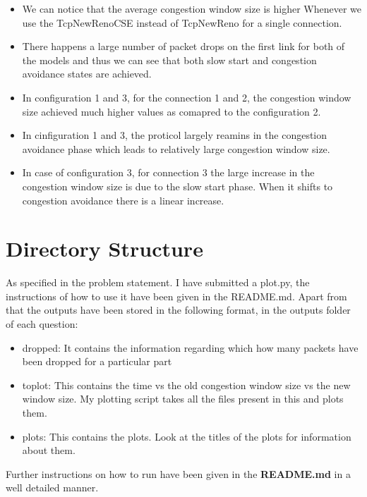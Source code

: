\documentclass{article}
\begin{document}
\begin{itemize}
    \item We can notice that the average congestion window size is higher Whenever we use the TcpNewRenoCSE instead of TcpNewReno for a single connection. 
    \item There happens a large number of packet drops on the first link for both of the models and thus we can see that both slow start and congestion avoidance states are achieved.
    \item In configuration 1 and 3, for the connection 1 and 2, the congestion window size achieved much higher values as comapred to the configuration 2.
    \item In cinfiguration 1 and 3, the proticol largely reamins in the congestion avoidance phase which leads to relatively large congestion window size.
    \item In case of configuration 3, for connection 3 the large increase in the congestion window size is due to the slow start phase. When it shifts to congestion avoidance there is a linear increase. 
\end{itemize}


\section{Directory Structure}

As specified in the problem statement. I have submitted a plot.py, the instructions of how to use it have been given in the README.md. Apart from that the outputs have been stored in the following format, in the outputs folder of each question:
\begin{itemize}
    \item dropped: It contains the information regarding which how many packets have been dropped for a particular part
    \item toplot: This contains the time vs the old congestion window size vs the new window size. My plotting script takes all the files present in this and plots them.
    \item plots: This contains the plots. Look at the titles of the plots for information about them.
\end{itemize}
Further instructions on how to run have been given in the \textbf{README.md} in a well detailed manner.
\end{document}
